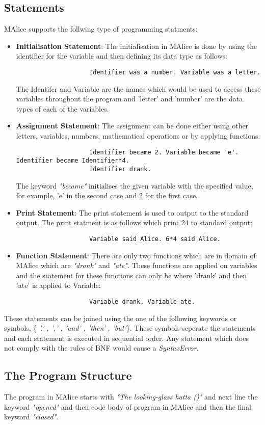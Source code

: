 \documentclass[a4wide, 11pt]{article}
\begin{document}
	\subsection{Statements}
	\label{sec:statements}
		MAlice supports the follwing type of programming statments:
		\begin{itemize}
			\item {\bf Initialisation Statement}: The initialisation in MAlice is done by using the identifier
		 		for the variable and then defining its data type as follows:
				\begin{verbatim}
					Identifier was a number. Variable was a letter.
				\end{verbatim}	
				The Identifer and Variable are the names which would be used to access these variables throughout
				the program and 'letter' and 'number' are the data types of each of the variables.
			\item {\bf Assignment Statement}: The assignment can be done either using other letters, variables, numbers,
				mathematical operations or by applying functions.
				\begin{verbatim}
					Identifier became 2. Variable became 'e'. Identifier became Identifier*4.
					Identifier drank.
				\end{verbatim}
				The keyword \emph{"became"} initialises the given variable with the specified value, for example,
				'e' in the second case and 2 for the first case.
			\item {\bf Print Statement}: The print statement is used to output to the standard output. The print
				statment is as follows which print 24 to standard output:
				\begin{verbatim}
					Variable said Alice. 6*4 said Alice.
				\end{verbatim}
			\item {\bf Function Statement}: There are only two functions which are in domain of MAlice which are
				\emph{"drank"} and \emph{"ate"}. These functions are applied on variables and the statement for these 
				functions can only be where 'drank' and then 'ate' is applied to Variable:
				\begin{verbatim}
					Variable drank. Variable ate.	
				\end{verbatim}
		\end{itemize}
		These statements can be joined using the one of the following keywords or symbols, \{ \emph{'.' , ',' , 'and' , 'then' , 'but'}\}.
		These symbols seperate the statements and each statement is executed in sequential order. Any statement which does not comply with
		the rules of BNF would cause a \emph{SyntaxError}.

	\subsection{The Program Structure}
	\label{sec:progStr}
		The program in MAlice starts with \emph{"The looking-glass hatta ()"} and next line the keyword \emph{"opened"}
		and then code body of program in MAlice and then the final keyword \emph{"closed"}.
\end{document}
